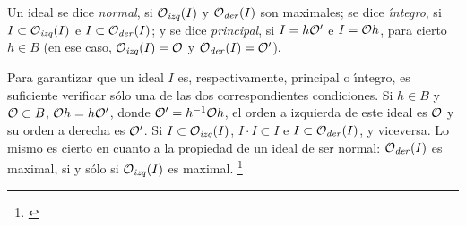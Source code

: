 Un ideal se dice \emph{normal}, si $\Oizq(I)$ y $\Oder(I)$ son maximales; se
dice \emph{\'{\i}ntegro}, si $I\subset\Oizq(I)$ e $I\subset\Oder(I)$; y se
dice \emph{principal}, si $I=h\cal{O}'$ e $I=\cal{O}h$, para cierto $h\in B$
(en ese caso, $\Oizq(I)=\cal{O}$ y $\Oder(I)=\cal{O}'$).

\begin{obsNormalIntegroPrincipal}\label{obs:normalintegroprincipal}
	Para garantizar que un ideal $I$ es, respectivamente, principal o
	\'{\i}ntegro, es suficiente verificar s\'{o}lo una de las dos
	correspondientes condiciones. Si $h\in B$ y $\cal{O}\subset B$,
	$\cal{O}h=h\cal{O}'$, donde $\cal{O}'=h^{-1}\cal{O}h$, el orden a
	izquierda de este ideal es $\cal{O}$ y su orden a derecha es
	$\cal{O}'$. Si $I\subset\Oizq(I)$, $I\cdot I\subset I$ e
	$I\subset\Oder(I)$, y viceversa. Lo mismo es cierto en cuanto a la
	propiedad de un ideal de ser normal: $\Oder(I)$ es maximal, si y
	s\'{o}lo si $\Oizq(I)$ es maximal.%
	\footnote{
		\cite[Satz~12, \S~2]{Deuring}
	}
\end{obsNormalIntegroPrincipal}

